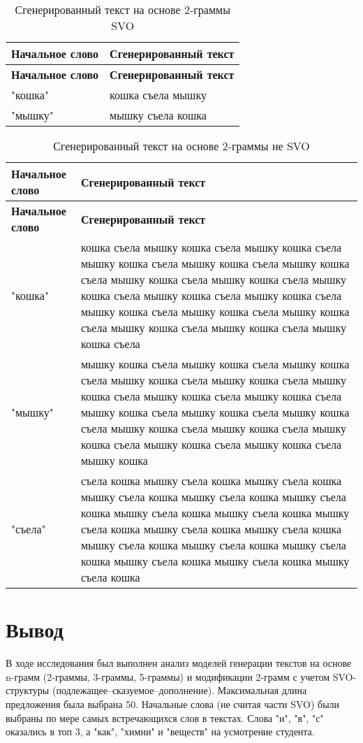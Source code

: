 \begin{longtable}{|p{4cm}|p{12cm}|}
    \caption{Сгенерированный текст на основе 2-граммы SVO}
    \hline
    \textbf{Начальное слово} & \textbf{Сгенерированный текст} \\ \hline
    \endfirsthead
    \hline
    \textbf{Начальное слово} & \textbf{Сгенерированный текст} \\ \hline
    \endhead
    "кошка" &   кошка съела мышку    \\ \hline
    "мышку" &   мышку съела кошка    \\ \hline
\end{longtable}

\begin{longtable}{|p{4cm}|p{12cm}|}
    \caption{Сгенерированный текст на основе 2-граммы не SVO}
    \hline
    \textbf{Начальное слово} & \textbf{Сгенерированный текст} \\ \hline
    \endfirsthead
    \hline
    \textbf{Начальное слово} & \textbf{Сгенерированный текст} \\ \hline
    \endhead
    "кошка" &   кошка съела мышку кошка съела мышку кошка съела мышку кошка съела мышку кошка съела мышку кошка съела мышку кошка съела мышку кошка съела мышку кошка съела мышку кошка съела мышку кошка съела мышку кошка съела мышку кошка съела мышку кошка съела мышку кошка съела мышку кошка съела мышку кошка съела    \\ \hline
    "мышку" &   мышку кошка съела мышку кошка съела мышку кошка съела мышку кошка съела мышку кошка съела мышку кошка съела мышку кошка съела мышку кошка съела мышку кошка съела мышку кошка съела мышку кошка съела мышку кошка съела мышку кошка съела мышку кошка съела мышку кошка съела мышку кошка съела мышку кошка    \\ \hline
    "съела" &  съела кошка мышку съела кошка мышку съела кошка мышку съела кошка мышку съела кошка мышку съела кошка мышку съела кошка мышку съела кошка мышку съела кошка мышку съела кошка мышку съела кошка мышку съела кошка мышку съела кошка мышку съела кошка мышку съела кошка мышку съела кошка мышку съела кошка    \\ \hline
\end{longtable}

\section*{Вывод}

В ходе исследования был выполнен анализ моделей генерации текстов на основе n-грамм (2-граммы, 3-граммы, 5-граммы) 
и модификации 2-грамм с учетом SVO-структуры (подлежащее–сказуемое–дополнение). Максимальная длина предложения была выбрана 50.
Начальные слова (не считая части SVO) были выбраны по мере самых встречающихся слов в текстах. 
Слова "и", "в", "с" оказались в топ 3, а "как", "химии" и "веществ" на усмотрение студента.

